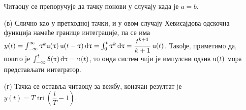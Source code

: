 Читаоцу се препоручује да тачку понови у случају када је $a=b$. 

(в) Слично као у претходној тачки, и у овом случају Хевисајдова одскочна функција намеће границе интеграције, па се има 
$y(t) = 
\int_{-\infty}^{\infty} \uptau^k {\rm u}(\uptau) \, {\rm u}(t-\uptau)  \, {\rm d} \uptau = 
\int_{0}^{t} \uptau^k \, {\rm d} \uptau = \dfrac{t^{k+1}}{k+1} \, {\rm u}(t)$.
Такође, приметимо да, пошто је $\int_{-\infty}^t \updelta(\uptau) \, {\rm d} \uptau = {\rm u}(t)$, то онда систем 
чији је импулсни одзив ${\rm u}(t)$ мора представљати интегратор. 

(г) Тачка се оставља читаоцу за вежбу, коначан резултат је 
$y(t) = T \operatorname{tri}\left( \dfrac tT - 1  \right)$.



